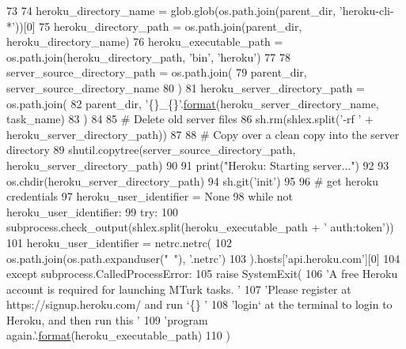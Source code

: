\begin{DoxyCode}
73 
74     heroku\_directory\_name = glob.glob(os.path.join(parent\_dir, \textcolor{stringliteral}{'heroku-cli-*'}))[0]
75     heroku\_directory\_path = os.path.join(parent\_dir, heroku\_directory\_name)
76     heroku\_executable\_path = os.path.join(heroku\_directory\_path, \textcolor{stringliteral}{'bin'}, \textcolor{stringliteral}{'heroku'})
77 
78     server\_source\_directory\_path = os.path.join(
79         parent\_dir, server\_source\_directory\_name
80     )
81     heroku\_server\_directory\_path = os.path.join(
82         parent\_dir, \textcolor{stringliteral}{'\{\}\_\{\}'}.\hyperlink{namespaceparlai_1_1chat__service_1_1services_1_1messenger_1_1shared__utils_a32e2e2022b824fbaf80c747160b52a76}{format}(heroku\_server\_directory\_name, task\_name)
83     )
84 
85     \textcolor{comment}{# Delete old server files}
86     sh.rm(shlex.split(\textcolor{stringliteral}{'-rf '} + heroku\_server\_directory\_path))
87 
88     \textcolor{comment}{# Copy over a clean copy into the server directory}
89     shutil.copytree(server\_source\_directory\_path, heroku\_server\_directory\_path)
90 
91     print(\textcolor{stringliteral}{"Heroku: Starting server..."})
92 
93     os.chdir(heroku\_server\_directory\_path)
94     sh.git(\textcolor{stringliteral}{'init'})
95 
96     \textcolor{comment}{# get heroku credentials}
97     heroku\_user\_identifier = \textcolor{keywordtype}{None}
98     \textcolor{keywordflow}{while} \textcolor{keywordflow}{not} heroku\_user\_identifier:
99         \textcolor{keywordflow}{try}:
100             subprocess.check\_output(shlex.split(heroku\_executable\_path + \textcolor{stringliteral}{' auth:token'}))
101             heroku\_user\_identifier = netrc.netrc(
102                 os.path.join(os.path.expanduser(\textcolor{stringliteral}{"~"}), \textcolor{stringliteral}{'.netrc'})
103             ).hosts[\textcolor{stringliteral}{'api.heroku.com'}][0]
104         \textcolor{keywordflow}{except} subprocess.CalledProcessError:
105             \textcolor{keywordflow}{raise} SystemExit(
106                 \textcolor{stringliteral}{'A free Heroku account is required for launching MTurk tasks. '}
107                 \textcolor{stringliteral}{'Please register at https://signup.heroku.com/ and run `\{\} '}
108                 \textcolor{stringliteral}{'login` at the terminal to login to Heroku, and then run this '}
109                 \textcolor{stringliteral}{'program again.'}.\hyperlink{namespaceparlai_1_1chat__service_1_1services_1_1messenger_1_1shared__utils_a32e2e2022b824fbaf80c747160b52a76}{format}(heroku\_executable\_path)
110             )

\end{DoxyCode}
